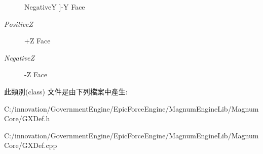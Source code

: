 \begin{Desc}
\begin{description}
{NegativeY\hypertarget{class_i_dream_sky_1_1_g_x_texture_cube_face_a31aed368f1e0cb4c7dca4b26e09244bda8c08835422b8322218dab1783316db43}{}\label{class_i_dream_sky_1_1_g_x_texture_cube_face_a31aed368f1e0cb4c7dca4b26e09244bda8c08835422b8322218dab1783316db43}
}]-\/Y Face \item[{\em 
PositiveZ\hypertarget{class_i_dream_sky_1_1_g_x_texture_cube_face_a31aed368f1e0cb4c7dca4b26e09244bda2bcfb5b9c382708248101557c0f50c12}{}\label{class_i_dream_sky_1_1_g_x_texture_cube_face_a31aed368f1e0cb4c7dca4b26e09244bda2bcfb5b9c382708248101557c0f50c12}
}]+Z Face \item[{\em 
NegativeZ\hypertarget{class_i_dream_sky_1_1_g_x_texture_cube_face_a31aed368f1e0cb4c7dca4b26e09244bda7d52f4c5c364c359c2f2a53eafb813df}{}\label{class_i_dream_sky_1_1_g_x_texture_cube_face_a31aed368f1e0cb4c7dca4b26e09244bda7d52f4c5c364c359c2f2a53eafb813df}
}]-\/Z Face \end{description}
\end{Desc}


此類別(class) 文件是由下列檔案中產生\+:\begin{DoxyCompactItemize}
\item 
C\+:/innovation/\+Government\+Engine/\+Epic\+Force\+Engine/\+Magnum\+Engine\+Lib/\+Magnum\+Core/G\+X\+Def.\+h\item 
C\+:/innovation/\+Government\+Engine/\+Epic\+Force\+Engine/\+Magnum\+Engine\+Lib/\+Magnum\+Core/G\+X\+Def.\+cpp\end{DoxyCompactItemize}
